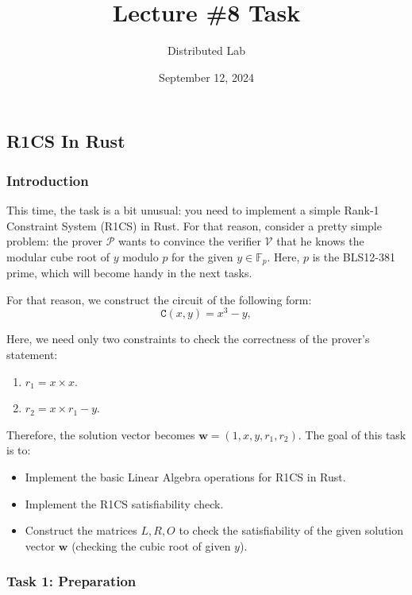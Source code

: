 \documentclass{zkdl-tests-template}
\title{\huge\sffamily\bfseries Lecture \#8 Task}
\author{\Large\sffamily Distributed Lab}
\date{\sffamily September 12, 2024}
\begin{document}
\pagestyle{fancy}

\maketitle

\vspace{20px}

\subsection{R1CS In Rust}

\subsubsection{Introduction}

This time, the task is a bit unusual: you need to implement a simple Rank-1 Constraint System (R1CS) in Rust. 
For that reason, consider a pretty simple problem: the prover $\mathcal{P}$ wants to convince the verifier
$\mathcal{V}$ that he knows the modular cube root of $y$ modulo $p$ for the given $y \in \mathbb{F}_p$. Here,
$p$ is the BLS12-381 prime, which will become handy in the next tasks.

For that reason, we construct the circuit of the following form:
\begin{equation*}
    \mathtt{C}(x,y) = x^3 - y,
\end{equation*}

Here, we need only two constraints to check the correctness of the prover's statement:
\begin{enumerate}
    \item $r_1 = x \times x$.
    \item $r_2 = x \times r_1 - y$.
\end{enumerate}

Therefore, the solution vector becomes $\mathbf{w} = (1,x,y,r_1,r_2)$. The goal of this task is to:
\begin{itemize}
    \item Implement the basic Linear Algebra operations for R1CS in Rust.
    \item Implement the R1CS satisfiability check.
    \item Construct the matrices $L,R,O$ to check the satisfiability of the given solution vector $\mathbf{w}$ (checking the cubic root of given $y$).
\end{itemize}

\subsubsection{Task 1: Preparation}
\end{document}

